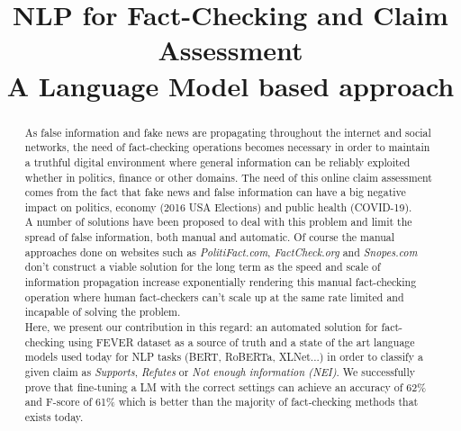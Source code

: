 \documentclass[conference]{IEEEtran}
\begin{document}
\title{NLP for Fact-Checking and Claim Assessment\\
{\Large A Language Model based approach}
}

\author{
\and
{}
}

\maketitle

\begin{abstract}
As false information and fake news are propagating throughout the internet and social networks, the need of fact-checking operations becomes necessary in order to maintain a truthful digital environment where general information can be reliably exploited whether in politics, finance or other domains. The need of this online claim assessment comes from the fact that fake news and false information can have a big negative impact on politics, economy (2016 USA Elections) and public health (COVID-19).\\ 
A number of solutions have been proposed to deal with this problem and limit the spread of false information, both manual and automatic. Of course the manual approaches done on websites such as \textit{PolitiFact.com}, \textit{FactCheck.org} and \textit{Snopes.com} don't construct a viable solution for the long term as the speed and scale of information propagation increase exponentially rendering this manual fact-checking operation where human fact-checkers can't scale up at the same rate limited and incapable of solving the problem.\\
Here, we present our contribution in this regard: an automated solution for fact-checking using FEVER dataset as a source of truth and a state of the art language models used today for NLP tasks (BERT, RoBERTa, XLNet...) in order to classify a given claim as \textit{Supports}, \textit{Refutes} or \textit{Not enough information (NEI)}. We successfully prove that fine-tuning a LM with the correct settings can achieve an accuracy of 62\% and F-score of 61\% which is better than the majority of fact-checking methods that exists today.\\
\end{abstract}
\end{document}
